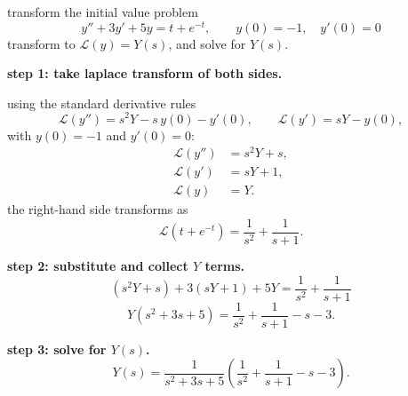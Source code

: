 \documentclass[12pt]{article}
\begin{document}
transform the initial value problem
\[
  y'' + 3y' + 5y = t + e^{-t}, \qquad y(0) = -1,\quad y'(0) = 0
\]
transform to $\mathcal{L}(y) = Y(s)$, and solve for $Y(s)$.

\medskip
\textbf{step 1: take laplace transform of both sides.}

using the standard derivative rules
\[
  \mathcal{L}(y'') = s^2 Y - s\,y(0) - y'(0), \qquad
  \mathcal{L}(y')  = s Y - y(0),
\]
with $y(0)=-1$ and $y'(0)=0$:
\begin{align*}
  \mathcal{L}(y'')  &= s^2 Y + s, \\
  \mathcal{L}(y')   &= sY + 1, \\
  \mathcal{L}(y)    &= Y.
\end{align*}
the right-hand side transforms as
\[
  \mathcal{L}(t + e^{-t}) = \frac{1}{s^2} + \frac{1}{s+1}.
\]

\textbf{step 2: substitute and collect $Y$ terms.}
\[
  (s^2 Y + s) + 3(sY + 1) + 5Y = \frac{1}{s^2} + \frac{1}{s+1}
\]
\[
  Y(s^2 + 3s + 5) = \frac{1}{s^2} + \frac{1}{s+1} - s - 3.
\]

\textbf{step 3: solve for $Y(s)$.}
\[
  \boxed{Y(s) = \frac{1}{s^2+3s+5}\!\left(\frac{1}{s^2}+\frac{1}{s+1}-s-3\right).}
\]
\end{document}
